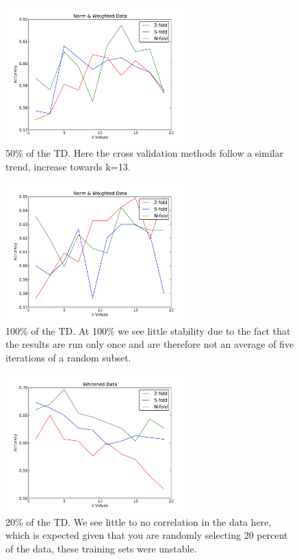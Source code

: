 \documentclass[conference]{acmsiggraph}
\begin{document}
\begin{figure}[h]
  \centering
  \includegraphics[width=2.8in]{images/alc_nw_50.pdf}
  \caption{50\% of the TD. Here the cross validation methods follow a similar trend, increase towards k=13.}
\end{figure}

\begin{figure}[h]
  \centering
  \includegraphics[width=2.8in]{images/alc_nw_100.pdf}
  \caption{100\% of the TD. At 100\% we see little stability due to the fact that the results are run only once and are therefore not an average of five iterations of a random subset.}
\end{figure}
\begin{figure}[h]
  \centering
  \includegraphics[width=2.8in]{images/alc_w_20.pdf}
  \caption{20\% of the TD. We see little to no correlation in the data here, which is expected given that you are randomly selecting 20 percent of the data, these training sets were unstable.}
\end{figure}
\end{document}
